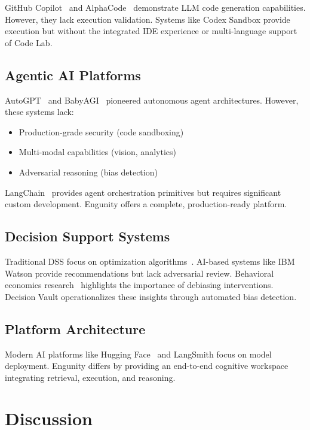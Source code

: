 \documentclass[conference]{IEEEtran}
\begin{document}
GitHub Copilot~\cite{chen2021evaluating} and AlphaCode~\cite{li2022competition} demonstrate LLM code generation capabilities. However, they lack execution validation. Systems like Codex Sandbox provide execution but without the integrated IDE experience or multi-language support of Code Lab.

\subsection{Agentic AI Platforms}

AutoGPT~\cite{autogpt2023} and BabyAGI~\cite{babyagi2023} pioneered autonomous agent architectures. However, these systems lack:
\begin{itemize}
    \item Production-grade security (code sandboxing)
    \item Multi-modal capabilities (vision, analytics)
    \item Adversarial reasoning (bias detection)
\end{itemize}

LangChain~\cite{chase2022langchain} provides agent orchestration primitives but requires significant custom development. Engunity offers a complete, production-ready platform.

\subsection{Decision Support Systems}

Traditional DSS focus on optimization algorithms~\cite{power2002decision}. AI-based systems like IBM Watson provide recommendations but lack adversarial review. Behavioral economics research~\cite{kahneman2011thinking} highlights the importance of debiasing interventions. Decision Vault operationalizes these insights through automated bias detection.

\subsection{Platform Architecture}

Modern AI platforms like Hugging Face~\cite{wolf2020transformers} and LangSmith focus on model deployment. Engunity differs by providing an end-to-end cognitive workspace integrating retrieval, execution, and reasoning.


\section{Discussion}
\end{document}
